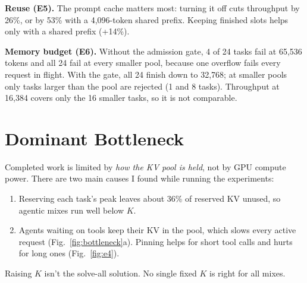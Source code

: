 \documentclass[10pt]{article}
\begin{document}
\textbf{Reuse (E5).} The prompt cache matters most: turning it off cuts throughput by 26\%, or by 53\% with a
4,096-token shared prefix. Keeping finished slots helps only with a shared prefix (+14\%).

\textbf{Memory budget (E6).} Without the admission gate, 4 of 24 tasks fail at 65,536 tokens and all 24 fail at every
smaller pool, because one overflow fails every request in flight. With the gate, all 24 finish down to 32,768; at smaller
pools only tasks larger than the pool are rejected (1 and 8 tasks). Throughput at 16,384 covers only the 16 smaller
tasks, so it is not comparable.

\section{Dominant Bottleneck}
Completed work is limited by \emph{how the KV pool is held}, not by GPU compute power. There are two main causes I found while running the experiments:
\begin{enumerate}
\item Reserving each task's peak leaves about 36\% of reserved KV unused, so agentic mixes run well below $K$.
\item Agents waiting on tools keep their KV in the pool, which slows every active request
(Fig.~\ref{fig:bottleneck}a). Pinning helps for short tool calls and hurts for long ones (Fig.~\ref{fig:e4}).
\end{enumerate}
Raising $K$ isn't the solve-all solution. No single fixed $K$ is right for all mixes.
\end{document}
